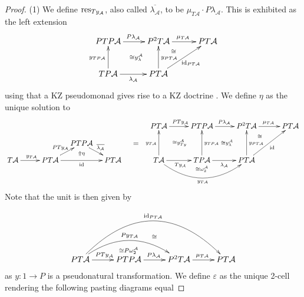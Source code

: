 \documentclass[a4paper,oneside,english]{amsart}
\numberwithin{equation}{section}
\numberwithin{figure}{section}
\theoremstyle{plain}
\theoremstyle{definition}
\theoremstyle{remark}
\theoremstyle{definition}
\theoremstyle{plain}
\theoremstyle{plain}
\theoremstyle{plain}
\begin{document}
\begin{proof}
(1) We define $\textnormal{res}_{Ty_{\mathcal{A}}}$, also called
$\overline{\lambda_{\mathcal{A}}}$, to be $\mu_{T\mathcal{A}}\cdot P\lambda_{\mathcal{A}}$.
This is exhibited as the left extension
\[
\xymatrix@=1em{PTP\mathcal{A}\ar[rr]^{P\lambda_{\mathcal{A}}}\ar@{}[rdrd]|-{\quad\cong y_{\lambda}^{\mathcal{A}}} &  & P^{2}T\mathcal{A}\ar[rr]^{\mu_{T\mathcal{A}}}\ar@{}[rd]|-{\cong} &  & PT\mathcal{A}\\
 &  &  & \;\\
TP\mathcal{A}\ar[rr]_{\lambda_{\mathcal{A}}}\ar[uu]^{y_{TP\mathcal{A}}} &  & PT\mathcal{A}\ar[uu]_{y_{PT\mathcal{A}}}\ar[rruu]_{\textnormal{id}_{PT\mathcal{A}}}
}
\]
using that a KZ pseudomonad gives rise to a KZ doctrine \cite{marm2012}.
We define $\eta$ as the unique solution to
\[
\xymatrix@=1em{ &  &  &  &  &  & PT\mathcal{A}\ar[rr]^{PTy_{\mathcal{A}}}\ar@{}[rdrd]|-{\cong y_{Ty}^{\mathcal{A}}} &  & PTP\mathcal{A}\ar[rr]^{P\lambda_{\mathcal{A}}}\ar@{}[rdrd]|-{\quad\cong y_{\lambda}^{\mathcal{A}}} &  & P^{2}T\mathcal{A}\ar[rr]^{\mu_{T\mathcal{A}}}\ar@{}[rd]|-{\cong} &  & PT\mathcal{A}\\
 &  &  & PTP\mathcal{A}\ar[rd]^{\overline{\lambda_{\mathcal{A}}}} &  & = &  &  &  &  &  & \;\\
T\mathcal{A}\ar[rr]^{y_{T\mathcal{A}}} &  & PT\mathcal{A}\ar[rr]_{\textnormal{id}}\ar[ru]^{PTy_{\mathcal{A}}} & \;\ar@{}[u]|-{\Uparrow\eta} & PT\mathcal{A} &  & T\mathcal{A}\ar[rr]_{Ty_{\mathcal{A}}}\ar[uu]^{y_{T\mathcal{A}}}\ar@/_{2pc}/[rrrr]_{y_{T\mathcal{A}}} &  & TP\mathcal{A}\ar[rr]_{\lambda_{\mathcal{A}}}\ar[uu]_{y_{TP\mathcal{A}}}\ar@{}[d]|-{\cong\omega_{2}^{\mathcal{A}}} &  & PT\mathcal{A}\ar[uu]_{y_{PT\mathcal{A}}}\ar[rruu]_{\textnormal{id}}\\
 &  &  & \; &  &  &  &  & \;
}
\]
Note that the unit is then given by 

\[
\xymatrix@=1em{ &  &  &  & \ar@{}[lld]|-{\cong}\\
 &  & \;\ar@{}[d]|-{\cong P\omega_{2}^{\mathcal{A}}}\\
PT\mathcal{A}\ar[rr]^{PTy_{\mathcal{A}}}\ar@/^{2pc}/[rrrr]^{Py_{T\mathcal{A}}}\ar@/^{4pc}/[rrrrrr]^{\textnormal{id}_{PT\mathcal{A}}} &  & PTP\mathcal{A}\ar[rr]^{P\lambda_{\mathcal{A}}} &  & P^{2}T\mathcal{A}\ar[rr]^{\mu_{T\mathcal{A}}} &  & PT\mathcal{A}
}
\]
as $y\colon1\to P$ is a pseudonatural transformation. We define ${\varepsilon}$
as the unique 2-cell rendering the following pasting diagrams equal


\end{proof}
\end{document}
